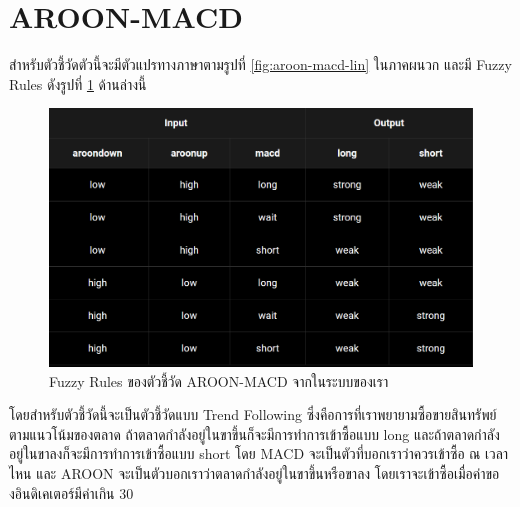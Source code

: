 \section{AROON-MACD}
สำหรับตัวชี้วัดตัวนี้จะมีตัวแปรทางภาษาตามรูปที่ \ref{fig:aroon-macd-lin} ในภาคผนวก และมี Fuzzy Rules ดังรูปที่ \ref{fig:aroon-macd-rules} ด้านล่างนี้
\begin{figure}[ht]
    \centering
    \includegraphics[width=\textwidth]{images/aroon-macd-rules.png}
    \caption{Fuzzy Rules ของตัวชี้วัด AROON-MACD จากในระบบของเรา}
    \label{fig:aroon-macd-rules}
\end{figure}

โดยสำหรับตัวชี้วัดนี้จะเป็นตัวชี้วัดแบบ Trend Following ซึ่งคือการที่เราพยายามซื้อขายสินทรัพย์ตามแนวโน้มของตลาด ถ้าตลาดกำลังอยู่ในขาขึ้นก็จะมีการทำการเข้าซื้อแบบ long และถ้าตลาดกำลังอยู่ในขาลงก็จะมีการทำการเข้าซื้อแบบ short โดย MACD จะเป็นตัวที่บอกเราว่าควรเข้าซื้อ ณ เวลาไหน และ AROON จะเป็นตัวบอกเราว่าตลาดกำลังอยู่ในขาขึ้นหรือขาลง โดยเราจะเข้าซื้อเมื่อค่าของอินดิเคเตอร์มีค่าเกิน 30


